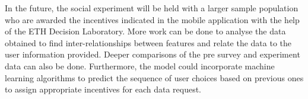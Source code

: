 In the future, the social experiment will be held with a larger sample population who are awarded the incentives indicated in the mobile application with the help of the ETH Decision Laboratory. More work can be done to analyse the data obtained to find inter-relationships between features and relate the data to the user information provided. Deeper comparisons of the pre survey and experiment data can also be done. Furthermore, the model could incorporate machine learning algorithms to predict the sequence of user choices based on previous ones to assign appropriate incentives for each data request. 
